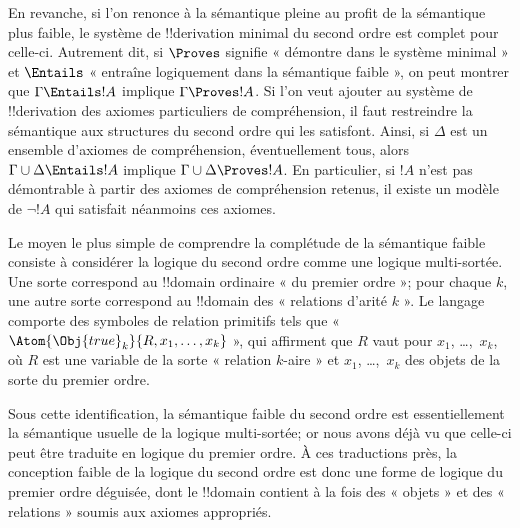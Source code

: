 \documentclass[../../../include/open-logic-section]{subfiles}
\begin{document}
En revanche, si l'on renonce à la sémantique pleine au profit de la
sémantique plus faible, le système de !!{derivation} minimal du
second ordre est complet pour celle-ci. Autrement dit, si
$\Proves$ signifie « démontre dans le système minimal » et
$\Entails$ « entraîne logiquement dans la sémantique faible »,
on peut montrer que $\Gamma \Entails !A$ implique
$\Gamma \Proves !A$. Si l'on veut ajouter au système de
!!{derivation} des axiomes particuliers de compréhension, il faut
restreindre la sémantique aux structures du second ordre qui les
satisfont. Ainsi, si $\Delta$ est un ensemble d'axiomes de
compréhension, éventuellement tous, alors
$\Gamma \cup \Delta \Entails !A$ implique
$\Gamma \cup \Delta \Proves !A$. En particulier, si $!A$ n'est
pas démontrable à partir des axiomes de compréhension retenus, il
existe un modèle de $\lnot !A$ qui satisfait néanmoins ces axiomes.

Le moyen le plus simple de comprendre la complétude de la sémantique
faible consiste à considérer la logique du second ordre comme une
logique multi-sortée. Une sorte correspond au !!{domain} ordinaire
« du premier ordre »; pour chaque $k$, une autre sorte correspond
au !!{domain} des « relations d'arité $k$ ». Le langage comporte
des symboles de relation primitifs tels que
« $\Atom{\Obj{true}_k}{R,x_1,\dots,x_k}$ », qui affirment que
$R$ vaut pour $x_1$, \dots,~$x_k$, où $R$ est une variable de la
sorte « relation $k$-aire » et $x_1$, \dots,~$x_k$ des objets de
la sorte du premier ordre.

Sous cette identification, la sémantique faible du second ordre est
essentiellement la sémantique usuelle de la logique multi-sortée;
or nous avons déjà vu que celle-ci peut être traduite en logique du
premier ordre. À ces traductions près, la conception faible de la
logique du second ordre est donc une forme de logique du premier
ordre déguisée, dont le !!{domain} contient à la fois des « objets »
et des « relations » soumis aux axiomes appropriés.
\end{document}
